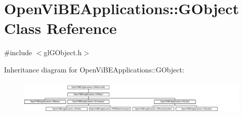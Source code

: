 \hypertarget{classOpenViBEApplications_1_1GObject}{
\section{OpenViBEApplications::GObject Class Reference}
\label{classOpenViBEApplications_1_1GObject}
}


{\ttfamily \#include $<$glGObject.h$>$}

Inheritance diagram for OpenViBEApplications::GObject:\begin{figure}[H]
\begin{center}
\leavevmode
\includegraphics[height=1.684211cm]{classOpenViBEApplications_1_1GObject}
\end{center}
\end{figure}
